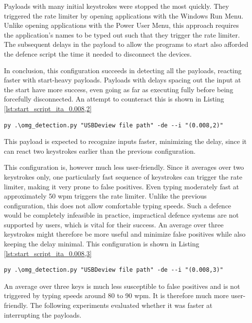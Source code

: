 Payloads with many initial keystrokes were stopped the most quickly. They triggered the rate limiter by opening applications with the Windows Run Menu. Unlike opening applications with the Power User Menu, this approach requires the application's names to be typed out such that they trigger the rate limiter. The subsequent delays in the payload to allow the programs to start also afforded the defence script the time it needed to disconnect the devices.  

In conclusion, this configuration succeeds in detecting all the payloads, reacting faster with start-heavy payloads. Payloads with delays spacing out the input at the start have more success, even going as far as executing fully before being forcefully disconnected. An attempt to counteract this is shown in Listing  \ref{lst:start_script_ita_0.008,2}   

\begin{lstlisting}[caption={start defence Script with ITA (0.008,2)},label={lst:start_script_ita_0.008,2}, captionpos=b]
 py .\omg_detection.py "USBDeview file path" -de --i "(0.008,2)"
\end{lstlisting}

This payload is expected to recognize inputs faster, minimizing the delay, since it can react two keystrokes earlier than the previous configuration. 

This configuration is, however much less user-friendly. Since it averages over two keystrokes only, one particularly fast sequence of keystrokes can trigger the rate limiter, making it very prone to false positives. Even typing moderately fast at approximately 50 wpm triggers the rate limiter. Unlike the previous configuration, this does not allow comfortable typing speeds. Such a defence would be completely infeasible in practice, impractical defence systems are not supported by users, which is vital for their success. An average over three keystrokes might therefore be more useful and minimize false positives while also keeping the delay minimal. This configuration is shown in Listing  \ref{lst:start_script_ita_0.008,3}   
\begin{lstlisting}[caption={start defence Script with ITA (0.008,3)},label={lst:start_script_ita_0.008,3}, captionpos=b]
 py .\omg_detection.py "USBDeview file path" -de --i "(0.008,3)"
\end{lstlisting}

An average over three keys is much less susceptible to false positives and is not triggered by typing speeds around 80 to 90 wpm. It is therefore much more user-friendly. The following experiments evaluated whether it was faster at interrupting the payloads. 

